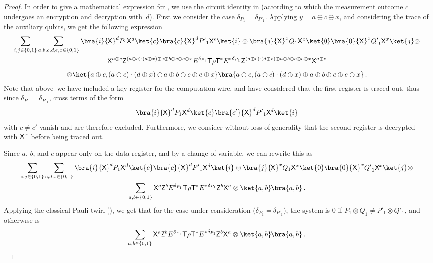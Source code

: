 \documentclass{toc}
\newcommand{\tgate}{{\sf T}}
\newcommand{\xgate}{{\sf X}}
\newcommand{\zgate}{{\sf Z}}
\newcommand{\ketbra}[2]{\ket{#1}\bra{#2}}			%
\newcommand{\egoketbra}[1]{\ketbra{#1}{#1}}			%
\begin{document}
\begin{proof}
In order to give a mathematical expression for , we use the circuit identity in  (according to which the measurement outcome $c$ undergoes an encryption and decryption with~$d$).  First we consider the case
$\delta_{P_1} = \delta_{P'_1}$. Applying  $ y =a \oplus c \oplus x$, and considering the trace of the auxiliary qubits, we get the following
 expression %
\begin{multline} \label{eqn:t-gate-first}
 \sum_{i,j \in \{0,1\}}\sum_{a,b,c,d,e,x \in \{0,1\}}  \bra{i}  \xgate^d P_1 \xgate^d \ketbra{c}{c} \xgate^d {{P'}_1} \xgate^d  \ket{i}  \otimes
  \bra{j} \xgate^x Q_1  \xgate^x \egoketbra{0} \xgate^x {{Q'}_1} \xgate^x \ket{j} \otimes
 \\\xgate^{a\oplus c}  \zgate^{(a \oplus c) \cdot (d \oplus x) \oplus a \oplus  b \oplus c \oplus e \oplus x}  E^{\delta_{P_1}} \tgate \rho \tgate^*  {E^*}^{\delta_{P_1}}
    \zgate^{(a \oplus c) \cdot (d \oplus x) \oplus a \oplus  b \oplus c \oplus e \oplus x}  \xgate^{a\oplus c} \\[1ex]
 \otimes \ket{a \oplus c, (a \oplus c) \cdot (d \oplus x) \oplus a \oplus b \oplus c \oplus e \oplus x  } \bra{a \oplus c,(a \oplus c) \cdot (d \oplus x) \oplus a \oplus b \oplus c \oplus e \oplus x}\,.
 \end{multline}
 Note that above, we have included a key register for the computation wire, and have considered that the first register is traced out, thus since $\delta_{P_1} = \delta_{P'_1}$, cross terms of the form
 \begin{equation}
   \bra{i}  \xgate^d P_1 \xgate^d \ketbra{c}{c'} \xgate^d {{P'}_1} \xgate^d  \ket{i}
 \end{equation}
 with $c \neq c'$ vanish and are therefore excluded.  Furthermore, we
 consider without loss of generality that the second register is
 decrypted with $\xgate^x$ before being traced out.

 Since $a$, $b$, and $e$ appear only on the data register, and by a change of variable,  we can
%
rewrite  %
this as
%
\begin{multline} \label{eqn:t-gate-first-ab}
 \sum_{i,j \in \{0,1\}} \sum_{c,d,x \in \{0,1\}}  \bra{i}  \xgate^d P_1 \xgate^d \ketbra{c}{c} \xgate^d {{P'}_1} \xgate^d  \ket{i}  \otimes
  \bra{j} \xgate^x  Q_1
 \xgate^x \egoketbra{0} \xgate^x {{Q'}_1}\xgate^x \ket{j}  \otimes
 \\ \sum_{a,b\in \{0,1\}}  \xgate^{a}  \zgate^{b}  E^{\delta_{P_1}} \tgate \rho \tgate^*  {E^*}^{\delta_{P_1}}
    \zgate^{b}  \xgate^{a}
 \otimes \ket{a,b} \bra{a,b}\,.
 \end{multline}
Applying the classical Pauli twirl (), we get that for the case  under consideration ($\delta_{P_1} = \delta_{P'_1}$), the system is $0$ if $P_1 \otimes Q_1 \neq P'_1 \otimes Q'_1$, and otherwise is%
\begin{equation} \label{eqn:simplified-t-gate}
\sum_{a,b\in \{0,1\}}  \xgate^{a}  \zgate^{b}  E^{\delta_{P_1}} \tgate \rho \tgate^*  {E^*}^{\delta_{P_1}}
    \zgate^{b}  \xgate^{a}
 \otimes \ket{a,b} \bra{a,b}\,.
\end{equation}


\end{proof}
\end{document}
